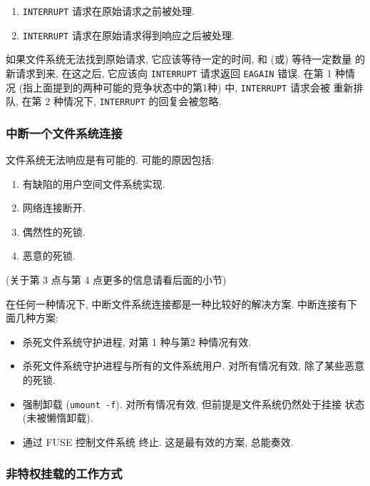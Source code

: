 \documentclass[nofonts, titlepage]{ctexart}
\begin{document}
\begin{enumerate}
\def\labelenumi{\arabic{enumi}.}
\item
  \texttt{INTERRUPT} 请求在原始请求之前被处理.
\item
  \texttt{INTERRUPT} 请求在原始请求得到响应之后被处理.
\end{enumerate}

如果文件系统无法找到原始请求, 它应该等待一定的时间, 和 (或) 等待一定数量
的新请求到来, 在这之后, 它应该向 \texttt{INTERRUPT} 请求返回
\texttt{EAGAIN} 错误. 在第 1 种情况
(指上面提到的两种可能的竞争状态中的第1种) 中, \texttt{INTERRUPT}
请求会被 重新排队, 在第 2 种情况下, \texttt{INTERRUPT} 的回复会被忽略.

\subsubsection{中断一个文件系统连接}\label{ux4e2dux65adux4e00ux4e2aux6587ux4ef6ux7cfbux7edfux8fdeux63a5}

文件系统无法响应是有可能的. 可能的原因包括:

\begin{enumerate}
\def\labelenumi{\arabic{enumi}.}
\item
  有缺陷的用户空间文件系统实现.
\item
  网络连接断开.
\item
  偶然性的死锁.
\item
  恶意的死锁.
\end{enumerate}

(关于第 3 点与第 4 点更多的信息请看后面的小节)

在任何一种情况下, 中断文件系统连接都是一种比较好的解决方案. 中断连接有下
面几种方案:

\begin{itemize}
\item
  杀死文件系统守护进程, 对第 1 种与第2 种情况有效.
\item
  杀死文件系统守护进程与所有的文件系统用户. 对所有情况有效, 除了某些恶意
  的死锁.
\item
  强制卸载 (\texttt{umount -f}). 对所有情况有效,
  但前提是文件系统仍然处于挂接 状态 (未被懒惰卸载).
\item
  通过 FUSE 控制文件系统 终止. 这是最有效的方案, 总能奏效.
\end{itemize}

\subsubsection{非特权挂载的工作方式}
\label{subsub:how_do_non_privileged_mounts_work}
\end{document}
